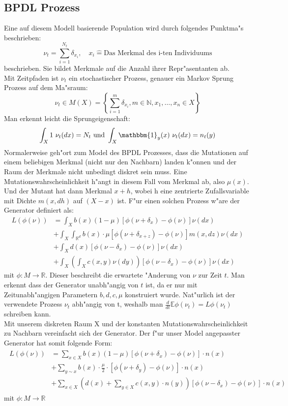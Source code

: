 \documentclass[11pt, a4paper, german]{article}
\theoremstyle{plain}
\begin{document}
	\subsection{BPDL Prozess}
	Eine auf diesem Modell basierende Population wird durch folgendes Punktma"s beschrieben:
	\[ \nu_t = \sum_{i=1}^{N_t} \delta_{x_i}, \quad x_i \hat{=} \text{Das Merkmal des i-ten Individuums} \]
	beschrieben. Sie bildet Merkmale auf die Anzahl ihrer Repr"asentanten ab.\\
	Mit Zeitpfaden ist $ \nu_t $ ein stochastischer Prozess, genauer ein Markov Sprung Prozess auf dem Ma"sraum:
	\[ \nu_t \in M(X) = \left\{ \sum_{i=1}^{m} \delta_{x_i}, m \in \mathbb{N}, x_1, \dots, x_n \in X \right\} \]
	Man erkennt leicht die Sprungeigenschaft:
	\[ \int_X 1 \text{ } \nu_t(dx) = N_t 
	\text{ und }
	\int_X \mathbbm{1}_y(x) \text{ } \nu_t(dx) = n_t(y) \]
	Normalerweise geh"ort zum Model des BPDL Prozesses, dass die Mutationen auf einem beliebigen Merkmal (nicht nur den Nachbarn) landen k"onnen und der Raum der Merkmale nicht unbedingt diskret sein muss. Eine Mutationswahrscheinlichkeit h"angt in diesem Fall vom Merkmal ab, also $ \mu(x) $. Und der Mutant hat dann Merkmal $ x + h $, wobei h eine zentrierte Zufallsvariable mit Dichte $ m(x,dh) $ auf $ (X - x) $ ist.
	F"ur einen solchen Prozess w"are der Generator definiert als:
	\begin{align*}
		L(\phi(\nu)) &= \int_{X} b(x)(1-\mu)[\phi(\nu + \delta_x) - \phi(\nu)]\nu(dx)\\
					  &+ \int_{X}\int_{\mathbb{R}^d} b(x) \cdot \mu [\phi(\nu + \delta_{x+z}) - \phi(\nu)] m(x,dz) \nu(dx)\\
				  	  &+ \int_{X} d(x)[\phi(\nu - \delta_x) - \phi(\nu)]\nu(dx)\\
				 	  &+ \int_{X} \left( \int_{X} c(x,y) \nu(dy) \right) [\phi(\nu - \delta_x) - \phi(\nu)]\nu(dx)
	\end{align*}
	mit $ \phi: M \to \mathbb{R} $. Dieser beschreibt die erwartete "Anderung von $ \nu $ zur Zeit $ t $. Man erkennt dass der Generator unabh"angig von $ t $ ist, da er nur mit Zeitunabh"angigen Parametern $ b, d, c, \mu $ konstruiert wurde. Nat"urlich ist der verwendete Prozess $ \nu_t $ abh"angig von t, weshalb man $ \frac{d}{dt}\mathbb{E}\phi(\nu_t) = L\phi(\nu_t) $ schreiben kann.\\
	Mit unserem diskreten Raum X und der konstanten Mutationswahrscheinlichkeit zu Nachbarn vereinfacht sich der Generator. Der f"ur unser Model angepasster Generator hat somit folgende Form:
	\begin{align}
	\begin{split}
		L(\phi(\nu)) &= \sum_{x \in X} b(x)(1-\mu)[\phi(\nu + \delta_{x}) - \phi(\nu)] \cdot n(x)\\
		&+ \sum_{y \sim x}b(x) \cdot \frac{\mu}{2} \cdot 
 [\phi(\nu + \delta_{y}) - \phi(\nu)] \cdot n(x)\\		 
		&+ \sum_{x \in X} \left(d(x) + \sum_{y \in X} c(x,y) \cdot n(y)\right)[\phi(\nu - \delta_{x}) - \phi(\nu)] \cdot n(x) \label{GeneratorDiskret}
	\end{split}
	\end{align}
	mit $ \phi: M \to \mathbb{R} $
\end{document}
